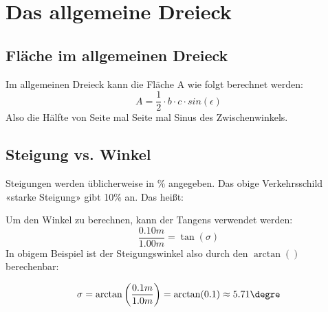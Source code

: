 
\newpage
\section{Das allgemeine Dreieck}

\subsection{Fläche im allgemeinen Dreieck}


Im allgemeinen Dreieck kann die Fläche A wie folgt berechnet werden:
$$A = \frac{1}{2}\cdot{}b\cdot{}c\cdot{}sin(\epsilon)$$
Also die Hälfte von Seite mal Seite mal Sinus des Zwischenwinkels.
\newpage


\subsection{Steigung vs. Winkel}


Steigungen werden üblicherweise in \% angegeben. Das obige
Verkehrsschild «starke Steigung» gibt 10\% an. Das heißt:


Um den Winkel zu berechnen, kann der Tangens verwendet werden:
$$\frac{0.10m}{1.00m} = \tan(\sigma)$$
In obigem Beispiel ist der Steigungswinkel also durch den $\arctan()$
berechenbar:

$$\sigma = \arctan\left(\frac{0.1m}{1.0m}\right) = \arctan(0.1) \approx 5.71\degre$$
\newpage

